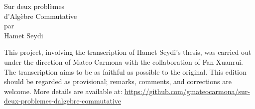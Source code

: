 \documentclass[12pt,twoside]{report} %
\begin{document}
\setcounter{tocdepth}{2}
\sloppy


\thispagestyle{empty}
\noindent\makebox[\linewidth]{\rule{4in}{0.01in}}
\vspace*{\fill}
\begin{center}
    {\Huge Sur deux problèmes} \\
    \vspace{0.5em}
    {\Huge d'Algèbre Commutative} \\
    \vspace{0.5em}
    {\Large par} \\
    \vspace{0.5em}
    {\huge Hamet Seydi}
\end{center}
\vspace*{\fill}
\noindent\makebox[\linewidth]{\rule{4in}{0.01in}}

\newpage 
\thispagestyle{empty}

\null\vfill
\noindent\begin{minipage}{\textwidth}
This project, involving the transcription of Hamet Seydi's thesis, was carried out under the direction of Mateo Carmona with the collaboration of Fan Xuanrui. The transcription aims to be as faithful as possible to the original. This edition should be regarded as provisional; remarks, comments, and corrections are welcome. More details are available at: \url{https://github.com/gmateocarmona/sur-deux-problemes-dalgebre-commutative}
\end{minipage}

\newpage
\end{document}
